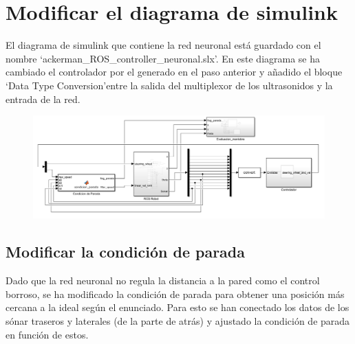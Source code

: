 \documentclass[a4paper, 12pt]{article}
\begin{document}
    \section{Modificar el diagrama de simulink}
	   
	El diagrama de simulink que contiene la red neuronal está guardado con el nombre \textquoteleft ackerman\_ROS\_controller\_neuronal.slx\textquoteright. En este diagrama se ha cambiado el controlador por el generado en el paso anterior y añadido el bloque \textquoteleft Data Type Conversion\textquoteright entre la salida del multiplexor de los ultrasonidos y la entrada de la red.

        \begin{figure}[htp!]
		\centering
		\includegraphics[width=1\textwidth]{PracticaFinal/figures/diagrama_simulink_neuronal.png}
	\end{figure}

        \subsection{Modificar la condición de parada}

            Dado que la red neuronal no regula la distancia a la pared como el control borroso, se ha modificado la condición de parada para obtener una posición más cercana a la ideal según el enunciado. Para esto se han conectado los datos de los sónar traseros y laterales (de la parte de atrás) y ajustado la condición de parada en función de estos.

            
 
\end{document}
